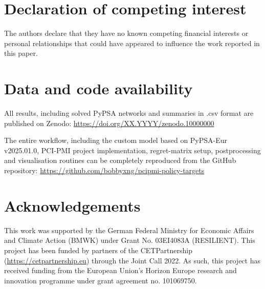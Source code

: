 \documentclass[preprint,12pt,sort&compress]{elsarticle}
\begin{document}
\section*{Declaration of competing interest}
The authors declare that they have no known competing financial interests or personal relationships that could have appeared to influence the work reported in this paper.

\section*{Data and code availability}
All results, including solved PyPSA networks and summaries in .csv format are published on Zenodo: \newline
\href{https://doi.org/XX.YYYY/zenodo.10000000}{https://doi.org/XX.YYYY/zenodo.10000000}

The entire workflow, including the custom model based on PyPSA-Eur v2025.01.0, PCI-PMI project implementation, regret-matrix setup, postprocessing and visualisation routines can be completely reproduced from the GitHub repository: \newline 
\href{https://github.com/bobbyxng/pcipmi-policy-targets}{https://github.com/bobbyxng/pcipmi-policy-targets}

\section*{Acknowledgements}
This work was supported by the German Federal Ministry for Economic Affairs and Climate Action (BMWK) under Grant No. 03EI4083A (RESILIENT). This project has been funded by partners of the CETPartnership (\href{https://cetpartnership.eu}{https://cetpartnership.eu}) through the Joint Call 2022. As such, this project has received funding from the European Union's Horizon Europe research and innovation programme under grant agreement no. 101069750.


\newpage
\appendix
\end{document}
